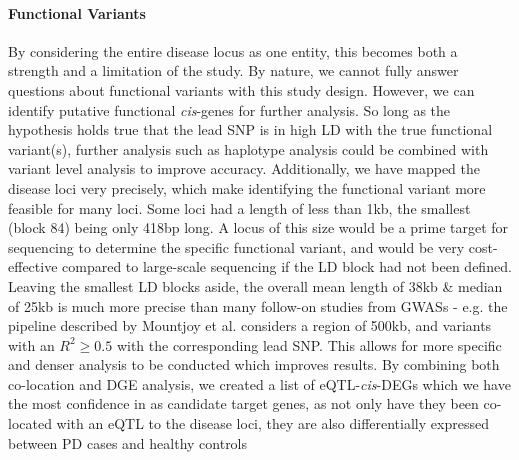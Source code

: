 \documentclass{article}
\begin{document}
\paragraph{Functional Variants}By considering the entire disease locus as one entity, this becomes both a strength and a limitation of the study. By nature, we cannot fully answer questions about functional variants with this study design. However, we can identify putative functional \textit{cis}-genes for further analysis.  So long as the hypothesis holds true that the lead SNP is in high LD with the true functional variant(s), further analysis such as haplotype analysis could be combined with variant level analysis to improve accuracy\cite{Liang2020HaplotypePhenotypes}. Additionally, we have mapped the disease loci very precisely, which make identifying the functional variant more feasible for many loci. Some loci had a length of less than 1kb, the smallest (block 84) being only 418bp long. A locus of this size would be a prime target for sequencing to determine the specific functional variant, and would be very cost-effective compared to large-scale sequencing if the LD block had not been defined. Leaving the smallest LD blocks aside, the overall mean length of 38kb \& median of 25kb is much more precise than many follow-on studies from GWASs - e.g. the pipeline described by Mountjoy et al.\cite{Mountjoy2021AnLoci} considers a region of 500kb, and variants with an $R^2\geq0.5$ with the corresponding lead SNP. This allows for more specific and denser analysis to be conducted which improves results\cite{Giambartolomei2014BayesianStatistics}. By combining both co-location and DGE analysis, we created a list of eQTL-\textit{cis}-DEGs which we have the most confidence in as candidate target genes, as not only have they been co-located with an eQTL to the disease loci, they are also differentially expressed between PD cases and healthy controls
\end{document}
